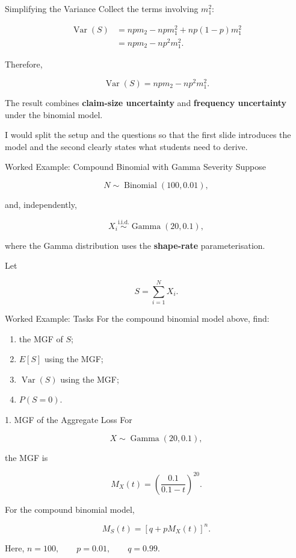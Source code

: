 \documentclass[
  ignorenonframetext,
  aspectratio=169,
]{beamer}
\providecommand{\tightlist}{%
  \setlength{\itemsep}{0pt}\setlength{\parskip}{0pt}}
\begin{document}
\begin{frame}{Simplifying the Variance}
\protect{}\label{simplifying-the-variance}
Collect the terms involving \(m_1^2\):

\[
\begin{aligned}
\operatorname{Var}(S)
&=npm_2
-npm_1^2
+np(1-p)m_1^2\\
&=npm_2-np^2m_1^2.
\end{aligned}
\]

Therefore,

\[
\boxed{
\operatorname{Var}(S)
=
npm_2-np^2m_1^2
}.
\]

The result combines \textbf{claim-size uncertainty} and
\textbf{frequency uncertainty} under the binomial model.

I would split the setup and the questions so that the first slide
introduces the model and the second clearly states what students need to
derive.
\end{frame}

\begin{frame}{Worked Example: Compound Binomial with Gamma Severity}
\protect{}\label{worked-example-compound-binomial-with-gamma-severity}
Suppose

\[
N\sim\operatorname{Binomial}(100,0.01),
\]

and, independently,

\[
X_i\overset{\text{i.i.d.}}{\sim}\operatorname{Gamma}(20,0.1),
\]

where the Gamma distribution uses the \textbf{shape-rate}
parameterisation.

Let

\[
S=\sum_{i=1}^{N}X_i.
\]
\end{frame}

\begin{frame}{Worked Example: Tasks}
\protect{}\label{worked-example-tasks}
For the compound binomial model above, find:

\begin{enumerate}
\tightlist
\item
  the MGF of \(S\);
\item
  \(E[S]\) using the MGF;
\item
  \(\operatorname{Var}(S)\) using the MGF;
\item
  \(P(S=0)\).
\end{enumerate}
\end{frame}

\begin{frame}{1. MGF of the Aggregate Loss}
\protect{}\label{mgf-of-the-aggregate-loss}
For

\[
X\sim\operatorname{Gamma}(20,0.1),
\]

the MGF is

\[
M_X(t)
=
\left(\frac{0.1}{0.1-t}\right)^{20}.
\]

For the compound binomial model,

\[
M_S(t)
=
\left[q+pM_X(t)\right]^n.
\]

Here, \(n=100,\qquad p=0.01,\qquad q=0.99.\)
\end{frame}
\end{document}
